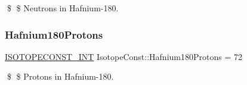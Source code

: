 \$ \$ Neutrons in Hafnium-\/180. \mbox{\label{group___isotope_const-_hafnium-_hf180_ga7c8d3727dd062390b370f9a8e7ae3890}} 
\subsubsection{\texorpdfstring{Hafnium180\+Protons}{Hafnium180Protons}}
{\footnotesize\ttfamily \mbox{\hyperlink{group___isotope_const-_macros_ga5f18360b3e99483a35c32d789e62621c}{I\+S\+O\+T\+O\+P\+E\+C\+O\+N\+S\+T\+\_\+\+I\+NT}} Isotope\+Const\+::\+Hafnium180\+Protons = 72}

\$ \$ Protons in Hafnium-\/180. 